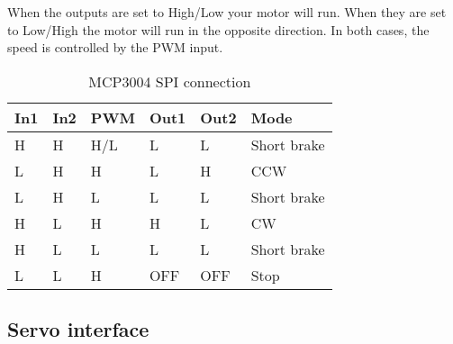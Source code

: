 \documentclass[
12pt, %
a4paper, %
oneside, %
headinclude,footinclude, %
BCOR5mm, %
]{scrartcl}
\begin{document}
When the outputs are set to High/Low your motor will run. When they are set to Low/High the motor will run in the opposite direction. In both cases, the speed is controlled by the PWM input.

\begin{table}[hbt]
\caption{MCP3004 SPI connection}
\centering
\begin{tabular}{llllll}
\toprule
In1  & In2 & PWM & Out1 & Out2 & Mode \\
\midrule
H    & H   & H/L & L    &L     & Short brake\\
L    & H   & H   & L    & H    & CCW\\
L    & H   & L   & L    & L    & Short brake\\
H    & L   & H   & H    & L    & CW\\
H    & L   & L   & L    & L    & Short brake\\
L    & L   & H   & OFF  & OFF  & Stop\\
\bottomrule
\end{tabular}
\label{tab:label}
\end{table}


\subsection{Servo interface}
\end{document}
